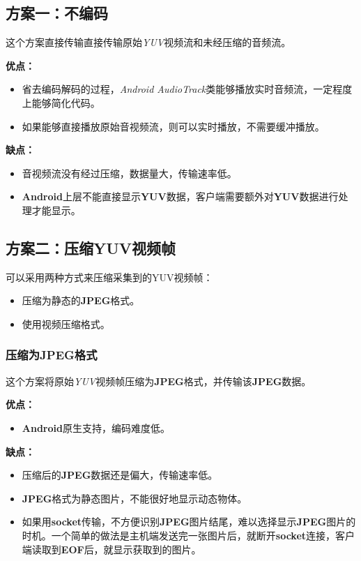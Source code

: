 \documentclass[11pt,a4paper]{article}
\begin{document}
\begin{CJK}{UTF8}{gbsn}
    \subsection{方案一：不编码}
    这个方案直接传输直接传输原始\emph{YUV}视频流和未经压缩的音频流。\par
    \textbf{优点：}
    \begin{itemize}
        \item 省去编码解码的过程，\emph{Android AudioTrack}类能够播放实时音频流，一定程度上能够简化代码。
        \item 如果能够直接播放原始音视频流，则可以实时播放，不需要缓冲播放。
    \end{itemize}

    \textbf{缺点：}
    \begin{itemize}
        \item 音视频流没有经过压缩，数据量大，传输速率低。
        \item \textbf{Android}上层不能直接显示\textbf{YUV}数据，客户端需要额外对\textbf{YUV}数据进行处理才能显示。
    \end{itemize}

    \subsection{方案二：压缩YUV视频帧}
    可以采用两种方式来压缩采集到的YUV视频帧：
    \begin{itemize}
        \item 压缩为静态的\textbf{JPEG}格式。
        \item 使用视频压缩格式。
    \end{itemize}

    \subsubsection{压缩为JPEG格式}
    这个方案将原始\emph{YUV}视频帧压缩为\textbf{JPEG}格式，并传输该\textbf{JPEG}数据。\par
    \textbf{优点：}
    \begin{itemize}
        \item \textbf{Android}原生支持，编码难度低。
    \end{itemize}

    \textbf{缺点：}
    \begin{itemize}
        \item 压缩后的\textbf{JPEG}数据还是偏大，传输速率低。
        \item \textbf{JPEG}格式为静态图片，不能很好地显示动态物体。
        \item 如果用\textbf{socket}传输，不方便识别\textbf{JPEG}图片结尾，难以选择显示\textbf{JPEG}图片的时机。一个简单的做法是主机端发送完一张图片后，就断开\textbf{socket}连接，客户端读取到\textbf{EOF}后，就显示获取到的图片。
    \end{itemize}


\end{CJK}
\end{document}
